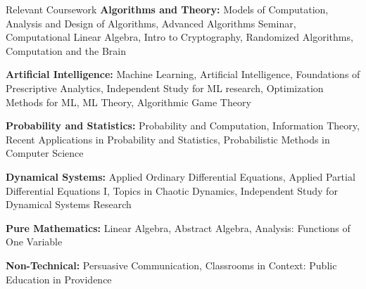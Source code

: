 \documentclass{resume} %
\begin{document}
\begin{rSection}{Relevant Coursework}
\textbf{Algorithms and Theory:} Models of Computation, Analysis and Design of Algorithms, Advanced Algorithms Seminar, Computational Linear Algebra, Intro to Cryptography, Randomized Algorithms, Computation and the Brain

\textbf{Artificial Intelligence:} Machine Learning, Artificial Intelligence, Foundations of Prescriptive Analytics, Independent Study for ML research, Optimization Methods for ML, ML Theory, Algorithmic Game Theory

\textbf{Probability and Statistics:} Probability and Computation, Information Theory, Recent Applications in Probability and Statistics, Probabilistic Methods in Computer Science

\textbf{Dynamical Systems:} Applied Ordinary Differential Equations, Applied Partial Differential Equations I, Topics in Chaotic Dynamics, Independent Study for Dynamical Systems Research

\textbf{Pure Mathematics:} Linear Algebra, Abstract Algebra, Analysis: Functions of One Variable

\textbf{Non-Technical:} Persuasive Communication, Classrooms in Context: Public Education in Providence

\end{rSection}






\end{document}
